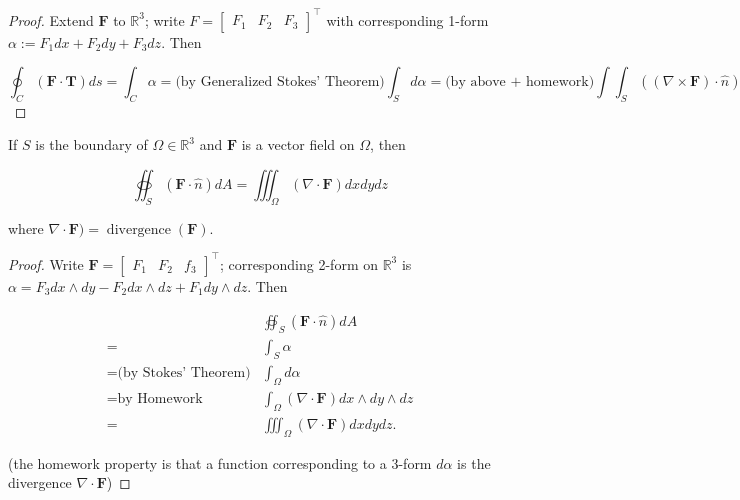 \begin{proof}

Extend \(\boldsymbol{F}\) to \(\mathbb{R}^3\); write \(F = \begin{bmatrix} F_1 & F_2 & F_3 \end{bmatrix}^\top\) with corresponding 1-form \(\alpha := F_1 dx + F_2 dy + F_3 dz\). Then

\[
\oint_C (\boldsymbol{F} \cdot \boldsymbol{T})ds = \int_C \alpha = \text{(by Generalized Stokes' Theorem)} \int_S d \alpha = \text{(by above + homework)} \int \int_S ( ( \nabla \times \boldsymbol{F}) \cdot \hat{n}) dA.
\]

\end{proof}

\begin{theorem}

If \(S\) is the boundary of \(\Omega \in \mathbb{R}^3\) and \(\boldsymbol{F}\) is a vector field on \(\Omega\), then

\[
\oiint_S (\boldsymbol{F} \cdot \hat{n}) dA = \iiint_\Omega (\nabla \cdot \boldsymbol{F}) dx dy dz
\] 

where \(\nabla \cdot \boldsymbol{F}) = \operatorname{divergence}(\boldsymbol{F})\).

\end{theorem}

\begin{proof}

Write \(\boldsymbol{F} = \begin{bmatrix}F_1 & F_2 & f_3 \end{bmatrix}^\top\); corresponding 2-form on \(\mathbb{R}^3\) is \(\alpha = F_3 dx \wedge dy - F_2 dx \wedge dz + F_1 dy \wedge dz\). Then

\begin{align*}
& \oiint_S (\boldsymbol{F} \cdot \hat{n}) dA  
\\ = & \int_S \alpha
\\  = \text{(by Stokes' Theorem)}  & \int_\Omega d\alpha 
\\ = \text{by Homework} & \int_\Omega (\nabla \cdot \boldsymbol{F}) dx \wedge dy \wedge dz
\\ = & \iiint_\Omega (\nabla \cdot \boldsymbol{F})dx dy dz.
\end{align*}

(the homework property is that a function corresponding to a 3-form \(d \alpha\) is the divergence \(\nabla \cdot \boldsymbol{F}\))

\end{proof}

